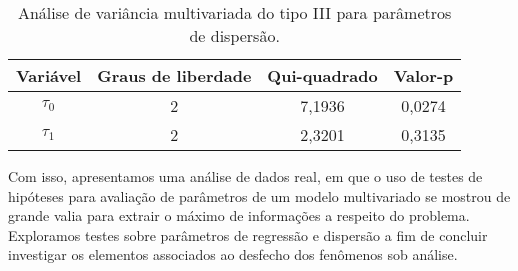 \begin{table}[H]
\centering
\begin{tabular}{cccc}
\hline
Variável               & Graus de liberdade & Qui-quadrado & Valor-p        \\ \hline
$\tau_0$ & 2                  & 7,1936       & 0,0274 \\
$\tau_1$ & 2                  & 2,3201       & 0,3135         \\ \hline
\end{tabular}
\caption{Análise de variância multivariada do tipo III para parâmetros de dispersão.}
\label{tab:manova_disp}
\end{table}


Com isso, apresentamos uma análise de dados real, em que o uso de testes de hipóteses para avaliação de parâmetros de um modelo multivariado se mostrou de grande valia para extrair o máximo de informações a respeito do problema. Exploramos testes sobre parâmetros de regressão e dispersão a fim de concluir investigar os elementos associados ao desfecho dos fenômenos sob análise.
